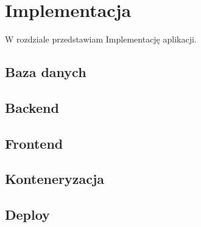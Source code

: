 \chapter{Implementacja}
\label{cha:Imp}

W rozdziale przedstawiam Implementację aplikacji. 


\section{Baza danych}
\label{sec:baza}



\section{Backend}
\label{sec:back}

\subsection{}


\section{Frontend}
\label{sec:front}

\subsection{}


\section{Konteneryzacja}
\label{sec:kont}



\section{Deploy}
\label{sec:deploy}

\subsection{}